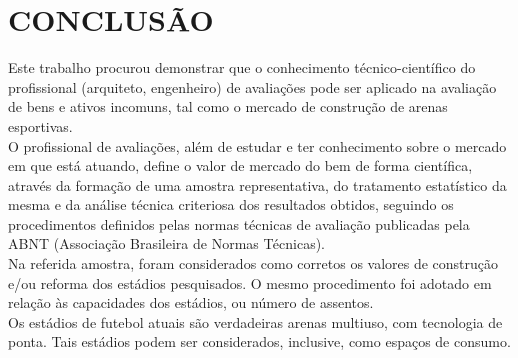 \section{ CONCLUSÃO }
\hspace*{1.25 cm} Este trabalho procurou demonstrar que o conhecimento técnico-científico do profissional (arquiteto, engenheiro) de avaliações pode ser aplicado na avaliação de bens e ativos incomuns, tal como o mercado de construção de arenas esportivas.\\ 
%
\hspace*{1.25 cm} O profissional de avaliações, além de estudar e ter conhecimento sobre o mercado em que está atuando, define o valor de mercado do bem de forma científica, através da formação de uma amostra representativa, do tratamento estatístico da mesma e da análise técnica criteriosa dos resultados obtidos, seguindo os procedimentos definidos pelas normas técnicas de avaliação publicadas pela ABNT (Associação Brasileira de Normas Técnicas).\\ 
%
\hspace*{1.25 cm}  Na referida amostra, foram considerados como corretos os valores de construção e/ou reforma dos estádios pesquisados. O mesmo procedimento foi adotado em relação às capacidades dos estádios, ou número de assentos.\\ 
%
\hspace*{1.25 cm}  Os estádios de futebol atuais são verdadeiras arenas multiuso, com tecnologia de ponta. Tais estádios podem ser considerados, inclusive, como espaços de consumo.